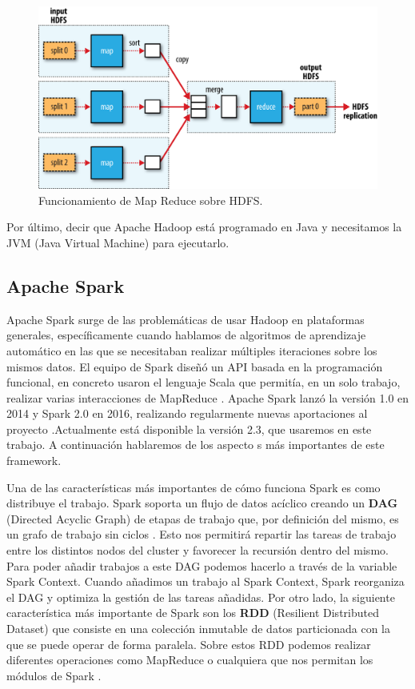 \begin{figure}[htp]
\centering
\includegraphics[scale=0.28]{Imagenes/hadoop1.png}
\caption{Funcionamiento de Map Reduce sobre HDFS. }
\label{hdImg1}
\end{figure}

Por último, decir que Apache Hadoop está programado en Java y necesitamos la JVM (Java Virtual Machine) para ejecutarlo.\par


\subsection{Apache Spark\label{Spark}}

Apache Spark surge de las problemáticas de usar Hadoop en plataformas generales, específicamente cuando hablamos de algoritmos de aprendizaje automático en las que se necesitaban realizar múltiples iteraciones sobre los mismos datos. El equipo de Spark diseñó un API basada en la programación funcional, en concreto usaron el lenguaje Scala que permitía, en un solo trabajo, realizar varias interacciones de MapReduce \cite{Spk-1}. Apache Spark lanzó la versión 1.0 en 2014 y Spark 2.0 en 2016, realizando regularmente nuevas aportaciones al proyecto \cite{Spk-2}.Actualmente está disponible la versión 2.3, que usaremos en este trabajo. A continuación hablaremos de los aspecto s más importantes de este framework.\par

Una de las características más importantes de cómo funciona Spark es como distribuye el trabajo. Spark soporta un flujo de datos acíclico creando un \textbf{DAG} (Directed Acyclic Graph) de etapas de trabajo que, por definición del mismo, es un grafo de trabajo sin ciclos \cite{Spk-5}. Esto nos permitirá repartir las tareas de trabajo entre los distintos nodos del cluster y favorecer la recursión dentro del mismo. Para poder añadir trabajos a este DAG podemos hacerlo a través de la variable Spark Context. Cuando añadimos un trabajo al Spark Context, Spark reorganiza el DAG y optimiza la gestión de las tareas añadidas. Por otro lado, la siguiente característica más importante de Spark son los \textbf{RDD} (Resilient Distributed Dataset) que consiste en una colección inmutable de datos particionada con la que se puede operar de forma paralela. Sobre estos RDD podemos realizar diferentes operaciones como MapReduce o cualquiera que nos permitan los módulos de Spark \cite{Spk-4}.\par

